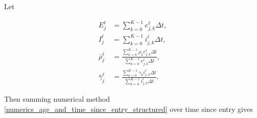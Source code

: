 \documentclass{jpmarticle}
\let\subequationsorig\subequations%
\let\endsubequationsorig\endsubequations%
\renewenvironment{subequations}{
  \subequationsorig
  \renewcommand{\theequation}{\theparentequation.\arabic{equation}}
}{
  \endsubequationsorig
}
\begin{document}
Let
\begin{subequations}
  \begin{align}
    E_j^{\ell}
    &= \sum_{k = 0}^{K - 1} e_{j, k}^{\ell} \Delta t,
    \\
    I_j^{\ell}
    &= \sum_{k = 0}^{K - 1} i_{j, k}^{\ell} \Delta t,
    \\
    \bar{\rho}_j^{\ell}
    &= \frac{\sum_{k = 0}^{K - 1} \rho_k e_{j, k}^{\ell} \Delta t}
      {\sum_{k = 0}^{K - 1} e_{j, k}^{\ell} \Delta t},
    \\
    \bar{\gamma}_j^{\ell}
    &= \frac{\sum_{k = 0}^{K - 1} \gamma_k i_{j, k}^{\ell} \Delta t}
      {\sum_{k = 0}^{K - 1} i_{j, k}^{\ell} \Delta t}.
  \end{align}
\end{subequations}
Then summing numerical method
\eqref{numerics_age_and_time_since_entry_structured} over time since
entry gives
\end{document}
